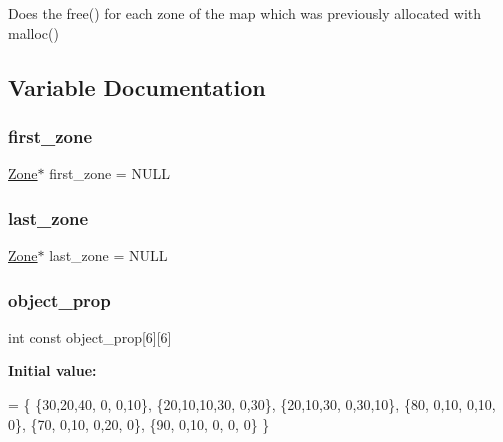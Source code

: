 Does the free() for each zone of the map which was previously allocated with malloc() 

\subsection{Variable Documentation}
\mbox{\label{group__map_ga77381c292d2d383101eda478b3147d99}} 
\subsubsection{\texorpdfstring{first\+\_\+zone}{first\_zone}}
{\footnotesize\ttfamily \hyperlink{group__map_ga25bd5049e352284b30a6a239fa772249}{Zone}$\ast$ first\+\_\+zone = N\+U\+LL\hspace{0.3cm}{\ttfamily [static]}}

\mbox{\label{group__map_ga74efc7d85bb74ab5ef4cde960e3c84f5}} 
\subsubsection{\texorpdfstring{last\+\_\+zone}{last\_zone}}
{\footnotesize\ttfamily \hyperlink{group__map_ga25bd5049e352284b30a6a239fa772249}{Zone}$\ast$ last\+\_\+zone = N\+U\+LL\hspace{0.3cm}{\ttfamily [static]}}

\mbox{\label{group__map_gaf2350ea2b3737b32c80c5cc2b1e8c434}} 
\subsubsection{\texorpdfstring{object\+\_\+prop}{object\_prop}}
{\footnotesize\ttfamily int const object\+\_\+prop\mbox{[}6\mbox{]}\mbox{[}6\mbox{]}\hspace{0.3cm}{\ttfamily [static]}}

{\bfseries Initial value\+:}
\begin{DoxyCode}
= \{
    \{30,20,40, 0, 0,10\},
    \{20,10,10,30, 0,30\},
    \{20,10,30, 0,30,10\},
    \{80, 0,10, 0,10, 0\},
    \{70, 0,10, 0,20, 0\},
    \{90, 0,10, 0, 0, 0\}
\}
\end{DoxyCode}
